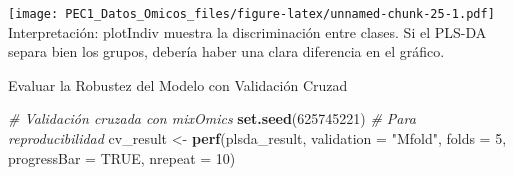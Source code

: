 \documentclass[
]{article}
\newenvironment{Shaded}{\begin{snugshade}}{\end{snugshade}}
\newcommand{\AttributeTok}[1]{\textcolor[rgb]{0.13,0.29,0.53}{#1}}
\newcommand{\CommentTok}[1]{\textcolor[rgb]{0.56,0.35,0.01}{\textit{#1}}}
\newcommand{\ConstantTok}[1]{\textcolor[rgb]{0.56,0.35,0.01}{#1}}
\newcommand{\DecValTok}[1]{\textcolor[rgb]{0.00,0.00,0.81}{#1}}
\newcommand{\FunctionTok}[1]{\textcolor[rgb]{0.13,0.29,0.53}{\textbf{#1}}}
\newcommand{\NormalTok}[1]{#1}
\newcommand{\OtherTok}[1]{\textcolor[rgb]{0.56,0.35,0.01}{#1}}
\newcommand{\StringTok}[1]{\textcolor[rgb]{0.31,0.60,0.02}{#1}}
\begin{document}
\texttt{[image: PEC1\_Datos\_Omicos\_files/figure-latex/unnamed-chunk-25-1.pdf]}
Interpretación: plotIndiv muestra la discriminación entre clases. Si el
PLS-DA separa bien los grupos, debería haber una clara diferencia en el
gráfico.

Evaluar la Robustez del Modelo con Validación Cruzad

\begin{Shaded}
\begin{Highlighting}[]
\CommentTok{\# Validación cruzada con mixOmics}
\FunctionTok{set.seed}\NormalTok{(}\DecValTok{625745221}\NormalTok{)  }\CommentTok{\# Para reproducibilidad}
\NormalTok{cv\_result }\OtherTok{\textless{}{-}} \FunctionTok{perf}\NormalTok{(plsda\_result, }\AttributeTok{validation =} \StringTok{"Mfold"}\NormalTok{, }\AttributeTok{folds =} \DecValTok{5}\NormalTok{, }\AttributeTok{progressBar =} \ConstantTok{TRUE}\NormalTok{, }\AttributeTok{nrepeat =} \DecValTok{10}\NormalTok{)}
\end{Highlighting}
\end{Shaded}
\end{document}
